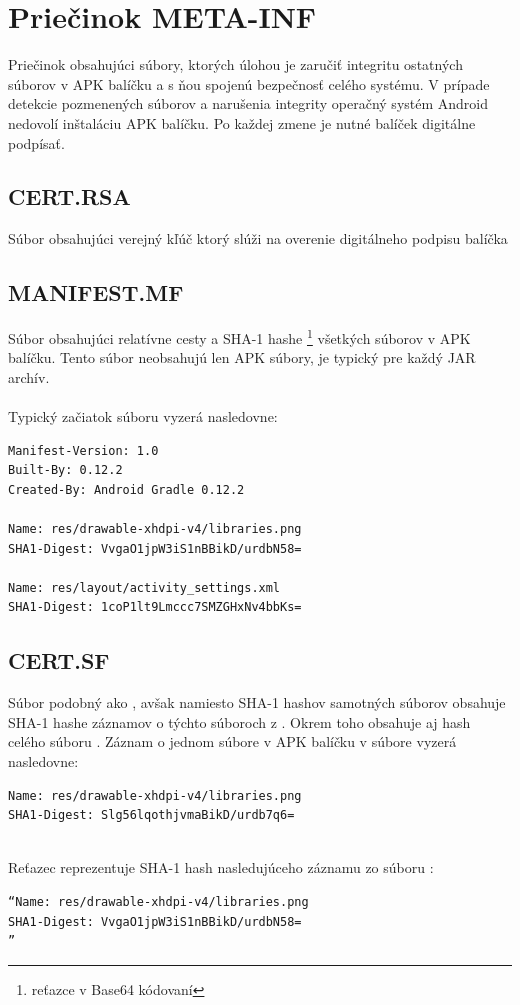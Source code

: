 \section{Priečinok META-INF}
Priečinok obsahujúci súbory, ktorých úlohou je zaručiť integritu ostatných súborov v APK balíčku a s ňou spojenú bezpečnosť celého systému. V prípade detekcie pozmenených súborov a narušenia integrity operačný systém Android nedovolí inštaláciu APK balíčku. Po každej zmene je nutné balíček digitálne podpísať.


\subsection*{CERT.RSA} 
Súbor obsahujúci verejný kľúč ktorý slúži na overenie digitálneho podpisu balíčka
\subsection*{MANIFEST.MF}
Súbor obsahujúci relatívne cesty a SHA-1 hashe \footnote{reťazce v Base64 kódovaní} všetkých súborov v APK balíčku. Tento súbor neobsahujú len APK súbory, je typický pre každý JAR archív.\\\\
Typický začiatok súboru  vyzerá nasledovne: \\

\begin{verbatim}
Manifest-Version: 1.0
Built-By: 0.12.2
Created-By: Android Gradle 0.12.2

Name: res/drawable-xhdpi-v4/libraries.png
SHA1-Digest: VvgaO1jpW3iS1nBBikD/urdbN58=

Name: res/layout/activity_settings.xml
SHA1-Digest: 1coP1lt9Lmccc7SMZGHxNv4bbKs=
\end{verbatim}

\subsection*{CERT.SF}
Súbor podobný ako , avšak namiesto SHA-1 hashov samotných súborov obsahuje SHA-1 hashe záznamov o týchto súboroch z . Okrem toho obsahuje aj hash celého súboru . \newline Záznam o jednom súbore v APK balíčku v súbore  vyzerá nasledovne: \newline
\begin{verbatim}
Name: res/drawable-xhdpi-v4/libraries.png
SHA1-Digest: Slg56lqothjvmaBikD/urdb7q6=
\end{verbatim}\mbox{}\\
Reťazec  reprezentuje SHA-1 hash nasledujúceho záznamu zo súboru :\mbox{}\\
\begin{verbatim}
“Name: res/drawable-xhdpi-v4/libraries.png
SHA1-Digest: VvgaO1jpW3iS1nBBikD/urdbN58=
”\end{verbatim}

